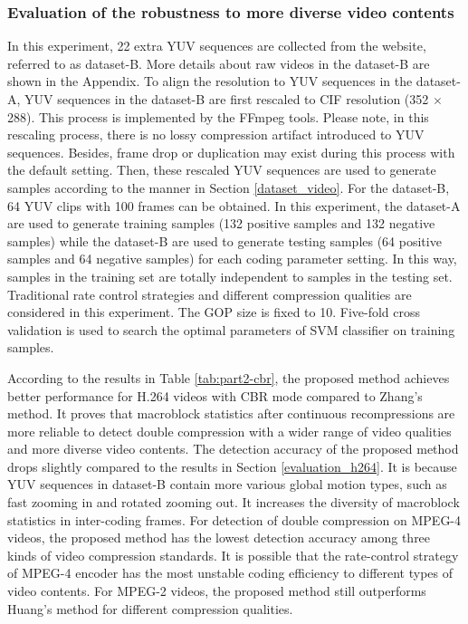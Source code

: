 \documentclass[journal,sort]{IEEEtran}
\begin{document}
\subsubsection{Evaluation of the robustness to more diverse video contents}
In this experiment, 22 extra YUV sequences are collected from the website, referred to as dataset-B. More details about raw videos in the dataset-B are shown in the Appendix. To align the resolution to YUV sequences in the dataset-A, YUV sequences in the dataset-B are first rescaled to CIF resolution (352 $\times$ 288). This process is implemented by the FFmpeg tools. Please note, in this rescaling process, there is no lossy compression artifact introduced to YUV sequences. Besides, frame drop or duplication may exist during this process with the default setting. Then, these rescaled YUV sequences are used to generate samples according to the manner in Section \ref{dataset_video}. For the dataset-B, 64 YUV clips with 100 frames can be obtained. In this experiment, the dataset-A are used to generate training samples (132 positive samples and 132 negative samples) while the dataset-B are used to generate testing samples (64 positive samples and 64 negative samples) for each coding parameter setting. In this way, samples in the training set are totally independent to samples in the testing set. Traditional rate control strategies and different compression qualities are considered in this experiment. The GOP size is fixed to 10. Five-fold cross validation is used to search the optimal parameters of SVM classifier on training samples.



According to the results in Table \ref{tab:part2-cbr}, the proposed method achieves better performance for H.264 videos with CBR mode compared to Zhang's method. It proves that macroblock statistics after continuous recompressions are more reliable to detect double compression with a wider range of video qualities and more diverse video contents. The detection accuracy of the proposed method drops slightly compared to the results in Section \ref{evaluation_h264}. It is because YUV sequences in dataset-B contain more various global motion types, such as fast zooming in and rotated zooming out. It increases the diversity of macroblock statistics in inter-coding frames.
For detection of double compression on MPEG-4 videos, the proposed method has the lowest detection accuracy among three kinds of video compression standards. It is possible that the rate-control strategy of MPEG-4 encoder has the most unstable coding efficiency to different types of video contents. For MPEG-2 videos, the proposed method still outperforms Huang's method for different compression qualities.
\end{document}
